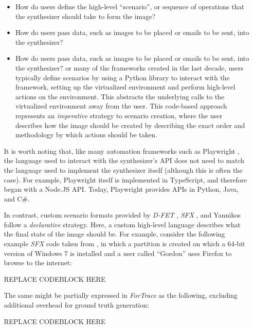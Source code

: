 \begin{itemize}
\item
  How do users define the high-level ``scenario'', or sequence of
  operations that the synthesizer should take to form the image?
\item
  How do users pass data, such as images to be placed or emails to be
  sent, into the synthesizer?
\item
  How do users pass data, such as images to be placed or emails to be
  sent, into the synthesizer? or many of the frameworks created in the
  last decade, users typically define scenarios by using a Python
  library to interact with the framework, setting up the virtualized
  environment and perform high-level actions on the environment. This
  abstracts the underlying calls to the virtualized environment away
  from the user. This code-based approach represents an
  \emph{imperative} strategy to scenario creation, where the user
  describes how the image should be created by describing the exact
  order and methodology by which actions should be taken.
\end{itemize}

It is worth noting that, like many automation frameworks such as
Playwright \cite{MicrosoftPlaywrightpython2025}, the language used
to interact with the synthesizer's API does not need to match the
language used to implement the synthesizer itself (although this is
often the case). For example, Playwright itself is implemented in
TypeScript, and therefore began with a Node.JS API. Today, Playwright
provides APIs in Python, Java, and C\#.

In contrast, custom scenario formats provided by \emph{D-FET}
\cite{williamCloudbasedDigitalForensics2011}, \emph{SFX}
\cite{russellForensicImageDescription2012}, and Yannikos
\cite{yannikosDataCorporaDigital2014} follow a \emph{declarative}
strategy. Here, a custom high-level language describes what the final
state of the image should be. For example, consider the following
example \emph{SFX} code taken from
\cite{russellForensicImageDescription2012}, in which a partition is
created on which a 64-bit version of Windows 7 is installed and a user
called ``Gordon'' uses Firefox to browse to the internet:

REPLACE CODEBLOCK HERE

The same might be partially expressed in \emph{ForTrace} as the
following, excluding additional overhead for ground truth generation:

REPLACE CODEBLOCK HERE

